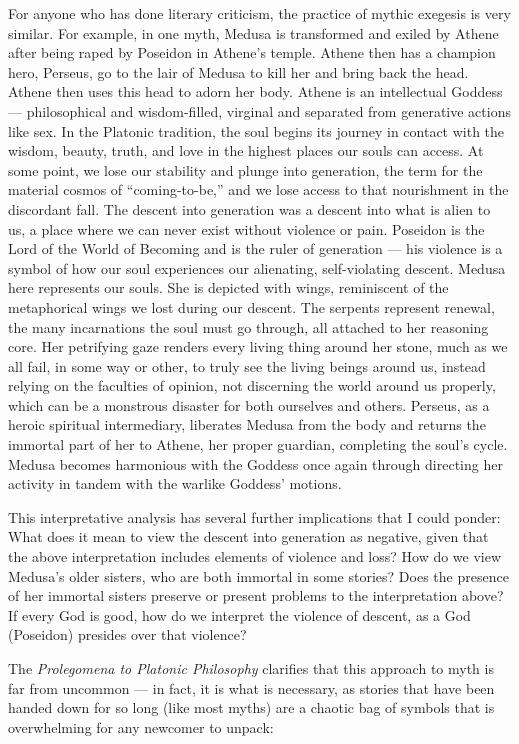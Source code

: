 \documentclass[
]{book}
\begin{document}
For anyone who has done literary criticism, the practice of mythic exegesis is very similar. For example, in one myth, Medusa is transformed and exiled by Athene after being raped by Poseidon in Athene's temple. Athene then has a champion hero, Perseus, go to the lair of Medusa to kill her and bring back the head. Athene then uses this head to adorn her body. Athene is an intellectual Goddess --- philosophical and wisdom-filled, virginal and separated from generative actions like sex. In the Platonic tradition, the soul begins its journey in contact with the wisdom, beauty, truth, and love in the highest places our souls can access. At some point, we lose our stability and plunge into generation, the term for the material cosmos of ``coming-to-be,'' and we lose access to that nourishment in the discordant fall. The descent into generation was a descent into what is alien to us, a place where we can never exist without violence or pain. Poseidon is the Lord of the World of Becoming and is the ruler of generation --- his violence is a symbol of how our soul experiences our alienating, self-violating descent. Medusa here represents our souls. She is depicted with wings, reminiscent of the metaphorical wings we lost during our descent. The serpents represent renewal, the many incarnations the soul must go through, all attached to her reasoning core. Her petrifying gaze renders every living thing around her stone, much as we all fail, in some way or other, to truly see the living beings around us, instead relying on the faculties of opinion, not discerning the world around us properly, which can be a monstrous disaster for both ourselves and others. Perseus, as a heroic spiritual intermediary, liberates Medusa from the body and returns the immortal part of her to Athene, her proper guardian, completing the soul's cycle. Medusa becomes harmonious with the Goddess once again through directing her activity in tandem with the warlike Goddess' motions.

This interpretative analysis has several further implications that I could ponder: What does it mean to view the descent into generation as negative, given that the above interpretation includes elements of violence and loss? How do we view Medusa's older sisters, who are both immortal in some stories? Does the presence of her immortal sisters preserve or present problems to the interpretation above? If every God is good, how do we interpret the violence of descent, as a God (Poseidon) presides over that violence?

The \emph{Prolegomena to Platonic Philosophy} clarifies that this approach to myth is far from uncommon --- in fact, it is what is necessary, as stories that have been handed down for so long (like most myths) are a chaotic bag of symbols that is overwhelming for any newcomer to unpack:
\end{document}
